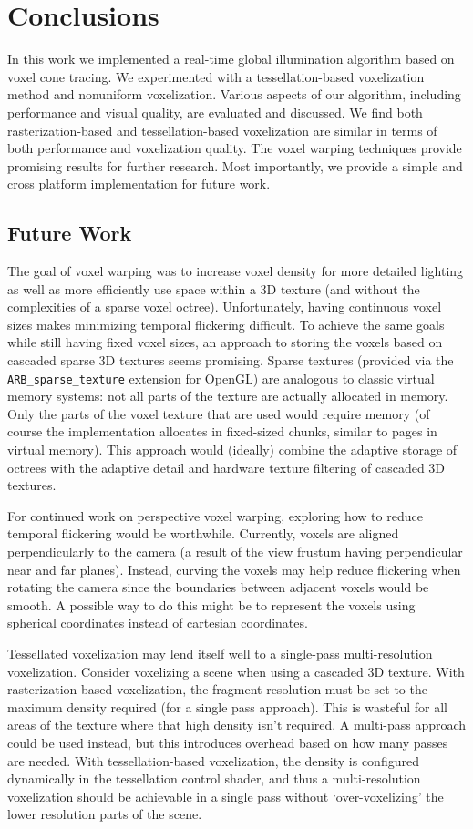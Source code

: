 \chapter{Conclusions}

In this work we implemented a real-time global illumination algorithm based on voxel cone tracing. We experimented with a tessellation-based voxelization method and nonuniform voxelization. Various aspects of our algorithm, including performance and visual quality, are evaluated and discussed. We find both rasterization-based and tessellation-based voxelization are similar in terms of both performance and voxelization quality. The voxel warping techniques provide promising results for further research. Most importantly, we provide a simple and cross platform implementation for future work.

\section{Future Work}
The goal of voxel warping was to increase voxel density for more detailed lighting as well as more efficiently use space within a 3D texture (and without the complexities of a sparse voxel octree). Unfortunately, having continuous voxel sizes makes minimizing temporal flickering difficult. To achieve the same goals while still having fixed voxel sizes, an approach to storing the voxels based on cascaded sparse 3D textures seems promising. Sparse textures (provided via the \verb#ARB_sparse_texture# extension for OpenGL) are analogous to classic virtual memory systems: not all parts of the texture are actually allocated in memory. Only the parts of the voxel texture that are used would require memory (of course the implementation allocates in fixed-sized chunks, similar to pages in virtual memory). This approach would (ideally) combine the adaptive storage of octrees with the adaptive detail and hardware texture filtering of cascaded 3D textures.

For continued work on perspective voxel warping, exploring how to reduce temporal flickering would be worthwhile. Currently, voxels are aligned perpendicularly to the camera (a result of the view frustum having perpendicular near and far planes). Instead, curving the voxels may help reduce flickering when rotating the camera since the boundaries between adjacent voxels would be smooth. A possible way to do this might be to represent the voxels using spherical coordinates instead of cartesian coordinates.

Tessellated voxelization may lend itself well to a single-pass multi-resolution voxelization. Consider voxelizing a scene when using a cascaded 3D texture. With rasterization-based voxelization, the fragment resolution must be set to the maximum density required (for a single pass approach). This is wasteful for all areas of the texture where that high density isn't required. A multi-pass approach could be used instead, but this introduces overhead based on how many passes are needed. With tessellation-based voxelization, the density is configured dynamically in the tessellation control shader, and thus a multi-resolution voxelization should be achievable in a single pass without `over-voxelizing' the lower resolution parts of the scene.

